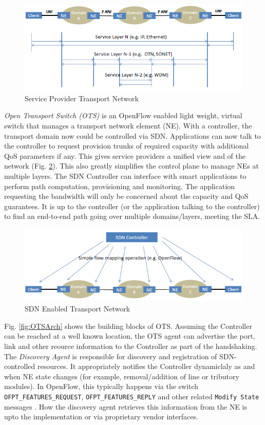 \documentclass{sig-alternate-10pt}
\begin{document}
	\begin{figure}[htb]
	\centering
	\includegraphics[scale=0.50]{MLwoOF.png}
	\caption{Service Provider Transport Network}
	\label{fig:MLwoOF}
	\end{figure}

	\textit{Open Transport Switch (OTS)} is an OpenFlow \cite{OF1.0} enabled light weight, virtual switch
	that manages a transport network element (NE). With a controller, the transport domain now could be
	controlled via SDN. Applications can now talk to the controller to request provision trunks of required
	capacity with additional QoS parameters if any. This gives service providers a unified view and of the
	network (Fig. \ref{fig:MLwOF}). This also greatly simplifies the control plane to manage NEs at multiple
	layers. The SDN Controller can interface with smart applications to perform path computation,
	provisioning and monitoring. The application requesting the bandwidth will only be concerned about the
	capacity and QoS guarantees. It is up to the controller (or the application talking to the controller) to
	find an end-to-end path going over multiple domains/layers, meeting the SLA.

	\begin{figure}[htb]
	\centering
	\includegraphics[scale=0.50]{MLwOF.png}
	\caption{SDN Enabled Transport Network}
	\label{fig:MLwOF}
	\end{figure}

	Fig. \ref{fig:OTSArch} shows the building blocks of OTS. Assuming the Controller can be reached at a well
	known location, the OTS agent can advertise the port, link and other reource information to the
	Controller as part of the handshaking. The \textit{Discovery Agent} is responsible for discovery and
	registration of SDN-controlled resources. It appropriately notifies the Controller dynamiclaly as and
	when NE state changes (for example, removal/addition of line or tributory modules). In OpenFlow, this
	typically happens via the switch \texttt{OFPT\_FEATURES\_REQUEST}, \texttt{OFPT\_FEATURES\_REPLY} and
	other related \texttt{Modify State} messages \cite{OF1.0}. How the discovery agent retrieves this
	information from the NE is upto the implementation or via proprietary vendor interfaces. \\
	
\end{document}
